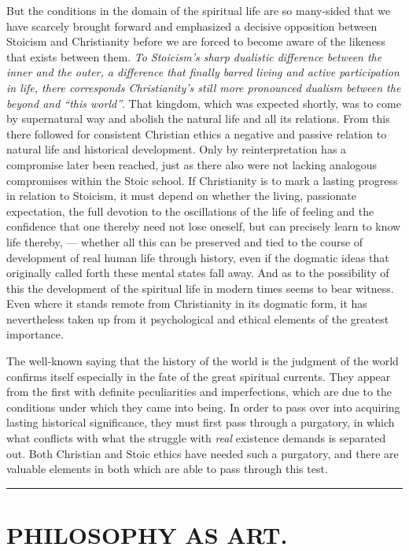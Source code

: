 \documentclass[12pt,a4paper,openany]{book}
\newcommand{\opage}[1]{\marginnote{\footnotesize\textit{[#1]}}}
\newcommand{\essay}[2][]{\chapter*{#2}\addcontentsline{toc}{chapter}{#1}}
\newcommand{\streg}{\begin{center}\rule{3em}{0.4pt}\end{center}}
\begin{document}
But the conditions in the domain of the spiritual
\opage{179}life are so many-sided that we have scarcely brought forward and emphasized
a decisive opposition between Stoicism and Christianity
before we are forced to become aware of the likeness that
exists between them. \emph{To Stoicism's sharp dualistic difference
between the inner and the outer, a difference that finally
barred living and active participation in life, there corresponds
Christianity's still more pronounced dualism between the
beyond and ``this world''}. That kingdom, which was expected
shortly, was to come by supernatural way and abolish
the natural life and all its relations. From this there followed for
consistent Christian ethics a negative and passive relation to
natural life and historical development. Only by
reinterpretation has a compromise later been reached, just as there
also were not lacking analogous compromises within the
Stoic school. If Christianity is to mark a lasting
progress in relation to Stoicism, it must depend on whether
the living, passionate expectation, the full devotion
to the oscillations of the life of feeling and the confidence that one
thereby need not lose oneself, but can precisely learn to
know life thereby, --- whether all this can be preserved and
tied to the course of development of real human life
through history, even if the dogmatic ideas that
originally called forth these mental states fall away.
And as to the possibility of this the development of the spiritual life
in modern times seems to bear witness. Even where it stands remote from Christianity
in its dogmatic form, it has nevertheless taken up from
it psychological and ethical elements of the greatest importance.

The well-known saying that the history of the world is
the judgment of the world confirms itself especially in the
fate of the great spiritual currents. They appear from the first with definite
peculiarities and imperfections, which are due to the conditions under
which they came into being. In order to pass over into acquiring lasting
historical significance, they must first pass through a purgatory,
in which what conflicts with what the struggle with
\emph{real} existence demands is separated out. Both Christian and
Stoic ethics have needed such a purgatory, and there
are valuable elements in both which are able to pass through
this test.

\streg{}

\opage{180}
\essay[Philosophy as Art]{PHILOSOPHY AS ART.}
\end{document}
